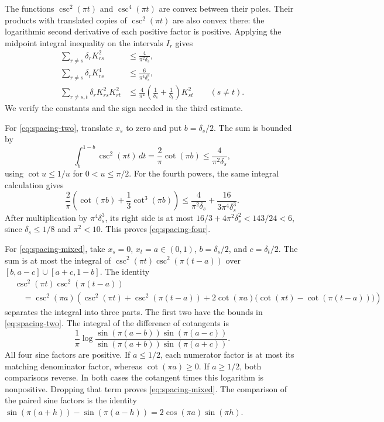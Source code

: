 The functions $\csc^2(\pi t)$ and $\csc^4(\pi t)$ are convex between
their poles.  Their products with translated copies of
$\csc^2(\pi t)$ are also convex there: the logarithmic second derivative
of each positive factor is positive.  Applying the midpoint integral
inequality on the intervals $I_r$ gives
\begin{align}
 \sum_{r\ne s}\delta_r K_{rs}^2
 &\leq\frac4{\pi^2\delta_s},
 \label{eq:spacing-two}\\
 \sum_{r\ne s}\delta_r K_{rs}^4
 &\leq\frac6{\pi^4\delta_s^3},
 \label{eq:spacing-four}\\
 \sum_{r\ne s,t}\delta_r K_{rs}^2K_{rt}^2
 &\leq\frac4{\pi^2}
 \left(\frac1{\delta_s}+\frac1{\delta_t}\right)K_{st}^2
 \qquad(s\ne t).
 \label{eq:spacing-mixed}
\end{align}
We verify the constants and the sign needed in the third estimate.

For \eqref{eq:spacing-two}, translate $x_s$ to zero and put
$b=\delta_s/2$.  The sum is bounded by
\[
 \int_b^{1-b}\csc^2(\pi t)\,dt
 =\frac2\pi\cot(\pi b)
 \leq\frac4{\pi^2\delta_s},
\]
using $\cot u\leq1/u$ for $0<u\leq\pi/2$.  For the fourth powers,
the same integral calculation gives
\[
 \frac2\pi\left(\cot(\pi b)+\frac13\cot^3(\pi b)\right)
 \leq\frac4{\pi^2\delta_s}
       +\frac{16}{3\pi^4\delta_s^3}.
\]
After multiplication by $\pi^4\delta_s^3$, its right side is at most
$16/3+4\pi^2\delta_s^2<143/24<6$, since
$\delta_s\leq1/8$ and $\pi^2<10$.  This proves
\eqref{eq:spacing-four}.

For \eqref{eq:spacing-mixed}, take $x_s=0$, $x_t=a\in(0,1)$,
$b=\delta_s/2$, and $c=\delta_t/2$.  The sum is at most the integral
of $\csc^2(\pi t)\csc^2(\pi(t-a))$ over
$[b,a-c]\cup[a+c,1-b]$.  The identity
\begin{align*}
 &\csc^2(\pi t)\csc^2(\pi(t-a))\\
 &\quad=\csc^2(\pi a)
 \left(\csc^2(\pi t)+\csc^2(\pi(t-a))
       +2\cot(\pi a)\bigl(\cot(\pi t)-\cot(\pi(t-a))\bigr)\right)
\end{align*}
separates the integral into three parts.  The first two have the
bounds in \eqref{eq:spacing-two}.  The integral of the difference of
cotangents is
\[
 \frac1\pi\log
 \frac{\sin(\pi(a-b))\sin(\pi(a-c))}
      {\sin(\pi(a+b))\sin(\pi(a+c))}.
\]
All four sine factors are positive.  If $a\leq1/2$, each numerator
factor is at most its matching denominator factor, whereas
$\cot(\pi a)\geq0$.  If $a\geq1/2$, both comparisons reverse.
In both cases the cotangent times this logarithm is nonpositive.
Dropping that term proves \eqref{eq:spacing-mixed}.  The comparison of
the paired sine factors is the identity
$\sin(\pi(a+h))-\sin(\pi(a-h))
=2\cos(\pi a)\sin(\pi h)$.

